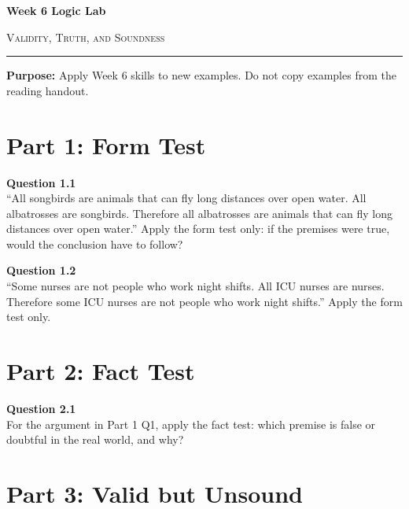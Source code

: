 \documentclass[12pt]{article}
\begin{document}
\begin{center}
{\LARGE\bfseries Week 6 Logic Lab}\par\vspace{0.05em}
{\large\scshape Validity, Truth, and Soundness}\par\vspace{0.1em}
\rule{0.78\textwidth}{0.5pt}\par\vspace{0.15em}
\end{center}

\noindent\textbf{Purpose:} Apply Week 6 skills to new examples. Do not copy examples from the reading handout.

\vspace{0.3em}

\section*{Part 1: Form Test}

\textbf{Question 1.1}\\[-0.15em]
``All songbirds are animals that can fly long distances over open water. All albatrosses are songbirds. Therefore all albatrosses are animals that can fly long distances over open water.'' Apply the form test only: if the premises were true, would the conclusion have to follow?


\textbf{Question 1.2}\\[-0.15em]
``Some nurses are not people who work night shifts. All ICU nurses are nurses. Therefore some ICU nurses are not people who work night shifts.'' Apply the form test only.


\newpage

\section*{Part 2: Fact Test}

\textbf{Question 2.1}\\[-0.15em]
For the argument in Part 1 Q1, apply the fact test: which premise is false or doubtful in the real world, and why?


\newpage

\section*{Part 3: Valid but Unsound}
\end{document}
